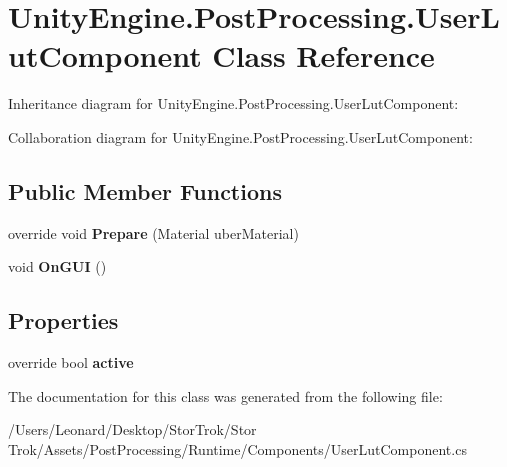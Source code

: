 \hypertarget{class_unity_engine_1_1_post_processing_1_1_user_lut_component}{}\section{Unity\+Engine.\+Post\+Processing.\+User\+Lut\+Component Class Reference}
\label{class_unity_engine_1_1_post_processing_1_1_user_lut_component}


Inheritance diagram for Unity\+Engine.\+Post\+Processing.\+User\+Lut\+Component\+:


Collaboration diagram for Unity\+Engine.\+Post\+Processing.\+User\+Lut\+Component\+:
\subsection*{Public Member Functions}
\begin{DoxyCompactItemize}
\item 
\mbox{\label{class_unity_engine_1_1_post_processing_1_1_user_lut_component_a1d6e06b6268b29af5a7903889feeff4b}} 
override void {\bfseries Prepare} (Material uber\+Material)
\item 
\mbox{\label{class_unity_engine_1_1_post_processing_1_1_user_lut_component_ab7f0a943efb49620ee830296108b0b9c}} 
void {\bfseries On\+G\+UI} ()
\end{DoxyCompactItemize}
\subsection*{Properties}
\begin{DoxyCompactItemize}
\item 
\mbox{\label{class_unity_engine_1_1_post_processing_1_1_user_lut_component_a44cd6587c8dd47f373ec18f8e56edcd8}} 
override bool {\bfseries active}
\end{DoxyCompactItemize}


The documentation for this class was generated from the following file\+:\begin{DoxyCompactItemize}
\item 
/\+Users/\+Leonard/\+Desktop/\+Stor\+Trok/\+Stor Trok/\+Assets/\+Post\+Processing/\+Runtime/\+Components/User\+Lut\+Component.\+cs\end{DoxyCompactItemize}
